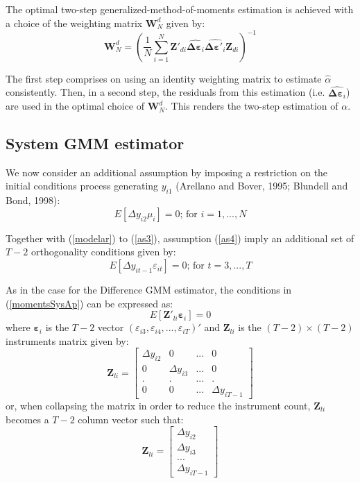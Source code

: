 \documentclass[12pt,a4paper,english]{article}%
\begin{document}
The optimal two-step generalized-method-of-moments estimation is achieved with a choice of the weighting matrix $\mathbf{W}_{N}^d$ given by:
\[
\mathbf{W}_{N}^d=\left( \frac{1}{N} \sum\limits_{i=1}^{N} \mathbf{Z}'_{di} \hat{ \mathbf{\Delta \varepsilon}_i} \hat{ \mathbf{\Delta \varepsilon}'_i} \mathbf{Z}_{di} \right)^{-1}
\]

The first step comprises on using an identity weighting matrix to estimate $\hat \alpha$ consistently. Then, in a second step, the residuals from this estimation (i.e. $\hat{\mathbf{\Delta \varepsilon}_i}$) are used in the optimal choice of $\mathbf{W}_{N}^d$. This renders the two-step estimation of $ \alpha$.

\subsection*{System GMM estimator}

We now consider an additional assumption by imposing a restriction on the initial conditions process generating $y_{i1}$ (Arellano and Bover, 1995; Blundell and Bond, 1998):
\begin{equation}
\label{as4}
\tag{6'}
E\left[\Delta y_{i2}\mu_{i}\right]=0\text{; for $i=1,...,N$}
\end{equation}

Together with (\ref{modelar}) to (\ref{as3}), assumption (\ref{as4}) imply an additional set of $T-2$ orthogonality conditions given by:
\begin{equation}
\label{momentsSysAp}
\tag{7'}
E\left[\Delta y_{it-1} \varepsilon_{it}\right]=0 \text{; for $t=3,...,T$}
\end{equation}

As in the case for the Difference GMM estimator, the conditions in (\ref{momentsSysAp}) can be expressed as:
\begin{equation*}
E\left[ \mathbf{Z}'_{li}\mathbf{ \varepsilon}_{i}\right]=0
\end{equation*}
where $\mathbf{\varepsilon}_{i}$ is the $T-2$ vector $( \varepsilon_{i3}, \varepsilon_{i4},..., \varepsilon_{iT})'$ and $\mathbf{Z}_{li}$ is the $(T-2)\times (T-2)$ instruments matrix given by:
\[
\mathbf{Z}_{li} = 
\left[ {\begin{array}{*{20}{c}}
{\Delta {y_{i2}}}&0&{...}&0\\
0&{\Delta {y_{i3}}}&{...}&0\\
.&.&{...}&.\\
0&0&{...}&{\Delta {y_{iT - 1}}}
\end{array}} \right]
\]
or, when collapsing the matrix in order to reduce the instrument count, $\mathbf{Z}_{li}$ becomes a $T-2$ column vector such that:
\[
\mathbf{Z}_{li} = 
\left[ {\begin{array}{*{20}{c}}
{\Delta {y_{i2}}}\\
{\Delta {y_{i3}}}\\
{...}\\
{\Delta {y_{iT - 1}}}
\end{array}} \right]
\]
\end{document}
